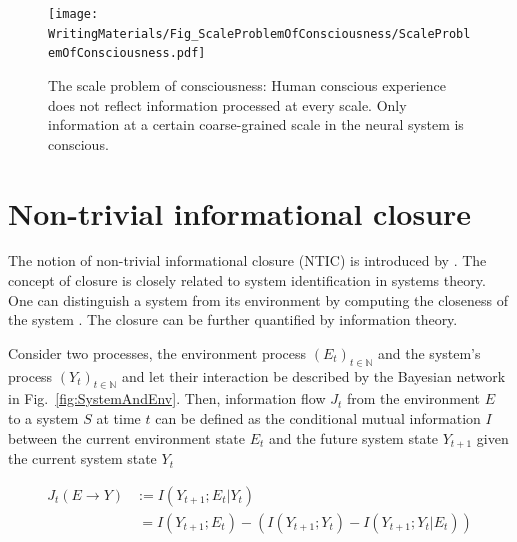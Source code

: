 \documentclass[utf8]{article}
\begin{document}
		\begin{figure}[H]
		    \centering
			\texttt{[image: WritingMaterials/Fig\_ScaleProblemOfConsciousness/ScaleProblemOfConsciousness.pdf]}
			\caption{The scale problem of consciousness: Human conscious experience does not reflect information processed at every scale. Only information at a certain coarse-grained scale in the neural system is conscious.}
			\label{fig:scaleproblem}
	   	\end{figure}


	\section{Non-trivial informational closure} \label{sec:Non-trivial informational closure}
		The notion of non-trivial informational closure (NTIC) is introduced by \cite{BERTSCHINGER.2006}. The concept of closure is closely related to system identification in systems theory. One can distinguish a system from its environment by computing the closeness of the system \citep{maturana1991autopoiesis, rosen1991life, pattee2012evolving, luhmann1995probleme}. The closure can be further quantified by information theory.



			\noindent
			Consider two processes, the environment process $(E_t)_{t \in \mathbb{N}}$ and the system's process $(Y_t)_{t \in \mathbb{N}}$ and let their interaction be described by the Bayesian network in Fig.~\ref{fig:SystemAndEnv}. Then, information flow $J_{t}$ from the environment $E$ to a system $S$ at time $t$ can be defined as the conditional mutual information $I$ between the current environment state $E_{t}$  and the future system state $Y_{t+1}$ given the current system state $Y_{t}$

				\begin{equation}
    				\label{eq:InformationFlow}
    				\left.\begin{array}
    				{rl}{J_{t}(E \rightarrow Y )} & {:= I(Y_{t+1};E_{t}|Y_{t})} \\
    				{ } & { \ = I(Y_{t+1};E_{t}) - (I(Y_{t+1};Y_{t})-I(Y_{t+1};Y_{t}|E_{t}))}
    				\end{array}\right.
				\end{equation}
\end{document}
